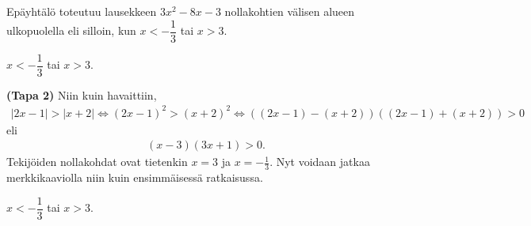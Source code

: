 \begin{esimerkki}
\begin{esimratk}
Epäyhtälö toteutuu lausekkeen $3x^2-8x-3$ nollakohtien välisen alueen ulkopuolella eli silloin, kun $x<-\dfrac{1}{3}$ tai $x>3$.
\end{esimratk}

\begin{esimvast}
$x<-\dfrac{1}{3}$ tai $x>3$.
\end{esimvast}

\begin{esimratk} \textbf{(Tapa 2)}
Niin kuin havaittiin,
\begin{align*}
|2x-1| > |x+2| \Leftrightarrow (2x-1)^2 > (x+2)^2 \Leftrightarrow ((2x-1)-(x+2))((2x-1)+(x+2)) > 0
\end{align*}
eli
\begin{align*}
(x-3)(3x+1)>0.
\end{align*}
Tekijöiden nollakohdat ovat tietenkin $x = 3$ ja $x = -\frac{1}{3}$. Nyt voidaan jatkaa merkkikaaviolla niin kuin ensimmäisessä ratkaisussa.
\end{esimratk}
\begin{esimvast}
$x<-\dfrac{1}{3}$ tai $x>3$.
\end{esimvast}
\end{esimerkki}


